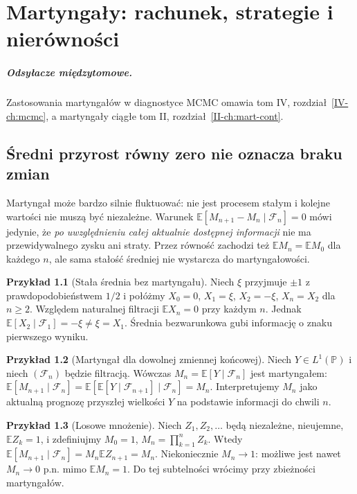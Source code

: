 \documentclass[11pt,a4paper,oneside]{report}
\numberwithin{equation}{chapter}
\theoremstyle{plain}
\theoremstyle{definition}
\newtheorem{przyklad}{Przykład}[chapter]
\theoremstyle{remark}
\newcommand{\Prob}{\mathbb{P}}
\newcommand{\E}{\mathbb{E}}
\begin{document}
\chapter{Martyngały: rachunek, strategie i nierówności}
\label{ch:martyngaly}
\paragraph{Odsyłacze międzytomowe.} Zastosowania martyngałów w diagnostyce MCMC omawia tom IV, rozdział~\ref{IV-ch:mcmc}, a martyngały ciągłe tom II, rozdział~\ref{II-ch:mart-cont}.


\section{Średni przyrost równy zero nie oznacza braku zmian}

Martyngał może bardzo silnie fluktuować: nie jest
procesem stałym i kolejne wartości nie muszą być
niezależne. Warunek
$\E[M_{n+1}-M_n\mid\mathcal F_n]=0$
mówi jedynie, że \emph{po uwzględnieniu całej
aktualnie dostępnej informacji} nie ma
przewidywalnego zysku ani straty.
Przez równość zachodzi też
$\E M_n=\E M_0$ dla każdego $n$,
ale sama stałość średniej nie wystarcza do
martyngałowości.

\begin{przyklad}[Stała średnia bez martyngału]
Niech $\xi$ przyjmuje $\pm1$ z prawdopodobieństwem
$1/2$ i połóżmy $X_0=0$, $X_1=\xi$,
$X_2=-\xi$, $X_n=X_2$ dla $n\geq2$.
Względem naturalnej filtracji $\E X_n=0$
przy każdym $n$. Jednak
$\E[X_2\mid\mathcal F_1]=-\xi\ne\xi=X_1$.
Średnia bezwarunkowa gubi informację o znaku
pierwszego wyniku.
\end{przyklad}

\begin{przyklad}[Martyngał dla dowolnej zmiennej końcowej]
Niech $Y\in L^1(\Prob)$ i niech $(\mathcal F_n)$
będzie filtracją. Wówczas
$M_n=\E[Y\mid\mathcal F_n]$ jest martyngałem:
$\E[M_{n+1}\mid\mathcal F_n]=
\E[\E[Y\mid\mathcal F_{n+1}]\mid\mathcal F_n]=M_n$.
Interpretujemy $M_n$ jako aktualną prognozę
przyszłej wielkości $Y$ na podstawie informacji
do chwili $n$.
\end{przyklad}

\begin{przyklad}[Losowe mnożenie]
Niech $Z_1,Z_2,\ldots$ będą niezależne, nieujemne,
$\E Z_k=1$, i zdefiniujmy $M_0=1$,
$M_n=\prod_{k=1}^n Z_k$.
Wtedy $\E[M_{n+1}\mid\mathcal F_n]
=M_n\E Z_{n+1}=M_n$.
Niekoniecznie $M_n\to1$: możliwe jest nawet
$M_n\to0$ p.n. mimo $\E M_n=1$.
Do tej subtelności wrócimy przy zbieżności
martyngałów.
\end{przyklad}
\end{document}
